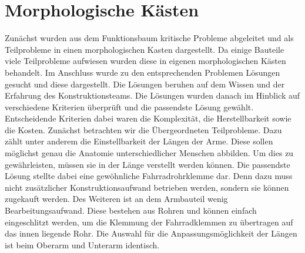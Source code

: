 \section{Morphologische Kästen}
	Zunächst wurden aus dem Funktionsbaum kritische Probleme abgeleitet und als Teilprobleme in einen morphologischen Kasten dargestellt. Da einige Bauteile viele Teilprobleme aufwiesen wurden diese in eigenen morphologischen Kästen behandelt. Im Anschluss wurde zu den entsprechenden Problemen Lösungen gesucht und diese dargestellt. Die Lösungen beruhen auf dem Wissen und der Erfahrung des Konstruktionsteams. Die Lösungen wurden danach im Hinblick auf verschiedene Kriterien überprüft und die passendste Lösung gewählt. Entscheidende Kriterien dabei waren die Komplexität, die Herstellbarkeit sowie die Kosten. 
	Zunächst betrachten wir die Übergeordneten Teilprobleme. 
	Dazu zählt unter anderem die Einstellbarkeit der Längen der Arme. Diese sollen möglichst genau die Anatomie unterschiedlicher Menschen abbilden. Um dies zu gewährleisten, müssen sie in der Länge verstellt werden können. Die passendste Lösung stellte dabei eine gewöhnliche Fahrradrohrklemme dar. Denn dazu muss nicht zusätzlicher Konstruktionsaufwand betrieben werden, sondern sie können zugekauft werden. Des Weiteren ist an dem Armbauteil wenig Bearbeitungsaufwand. Diese bestehen aus Rohren und können einfach eingeschlitzt werden, um die Klemmung der Fahrradklemmen zu übertragen auf das innen liegende Rohr. Die Auswahl für die Anpassungsmöglichkeit der Längen ist beim Oberarm und Unterarm identisch.

